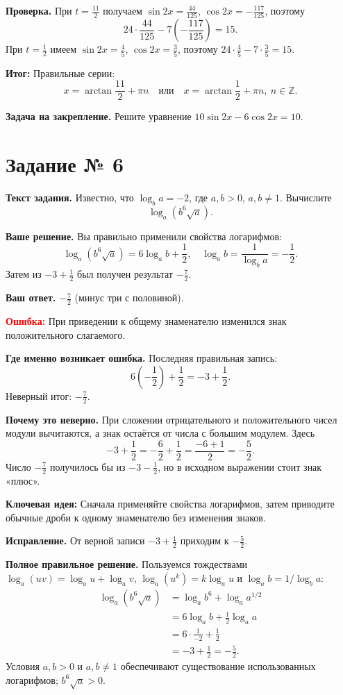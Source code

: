 \documentclass[12pt,a4paper]{article}
\newcommand{\err}{\textcolor{red}{Ошибка:}}
\newcommand{\idea}{\textcolor{blue!60!black}{Ключевая идея:}}
\newcommand{\result}{\textcolor{teal!60!black}{Итог:}}
\begin{document}
\textbf{Проверка.} При $t=\frac{11}{2}$ получаем $\sin2x=\frac{44}{125}$, $\cos2x=-\frac{117}{125}$, поэтому
\[24\cdot\frac{44}{125}-7\left(-\frac{117}{125}\right)=15.\]
При $t=\frac12$ имеем $\sin2x=\frac45$, $\cos2x=\frac35$, поэтому $24\cdot\frac45-7\cdot\frac35=15$.

\textbf{\result} Правильные серии:
\[\boxed{x=\arctan\frac{11}{2}+\pi n\quad\text{или}\quad x=\arctan\frac12+\pi n,\ n\in\mathbb Z.}\]

\textbf{Задача на закрепление.} Решите уравнение $10\sin2x-6\cos2x=10$.

\newpage
{}\label{task:6}
\section*{Задание № 6}
\textbf{Текст задания.} Известно, что $\log_b a=-2$, где $a,b>0$, $a,b\ne1$. Вычислите
\[\log_a\left(b^6\sqrt a\right).\]

\textbf{Ваше решение.} Вы правильно применили свойства логарифмов:
\[\log_a(b^6\sqrt a)=6\log_a b+\frac12,\quad
\log_a b=\frac1{\log_b a}=-\frac12.\]
Затем из $-3+\frac12$ был получен результат $-\frac72$.

\textbf{Ваш ответ.} $-\frac72$ (минус три с половиной).

\textbf{\err} При приведении к общему знаменателю изменился знак положительного слагаемого.

\textbf{Где именно возникает ошибка.} Последняя правильная запись:
\[6\left(-\frac12\right)+\frac12=-3+\frac12.\]
Неверный итог: $-\frac72$.

\textbf{Почему это неверно.} При сложении отрицательного и положительного чисел модули вычитаются, а знак остаётся от числа с большим модулем. Здесь
\[-3+\frac12=-\frac62+\frac12=\frac{-6+1}{2}=-\frac52.\]
Число $-\frac72$ получилось бы из $-3-\frac12$, но в исходном выражении стоит знак «плюс».

\textbf{\idea} Сначала применяйте свойства логарифмов, затем приводите обычные дроби к одному знаменателю без изменения знаков.

\textbf{Исправление.} От верной записи $-3+\frac12$ приходим к $-\frac52$.

\textbf{Полное правильное решение.} Пользуемся тождествами $\log_a(uv)=\log_a u+\log_a v$, $\log_a(u^k)=k\log_a u$ и $\log_a b=1/\log_b a$:
\begin{align*}
\log_a\left(b^6\sqrt a\right)
 &=\log_a b^6+\log_a a^{1/2}\\
 &=6\log_a b+\frac12\log_a a\\
 &=6\cdot\frac1{-2}+\frac12\\
 &=-3+\frac12=-\frac52.
\end{align*}
Условия $a,b>0$ и $a,b\ne1$ обеспечивают существование использованных логарифмов; $b^6\sqrt a>0$.
\end{document}
